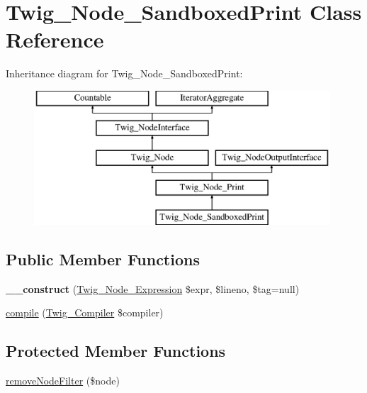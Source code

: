 \hypertarget{class_twig___node___sandboxed_print}{}\section{Twig\+\_\+\+Node\+\_\+\+Sandboxed\+Print Class Reference}
\label{class_twig___node___sandboxed_print}
Inheritance diagram for Twig\+\_\+\+Node\+\_\+\+Sandboxed\+Print\+:\begin{figure}[H]
\begin{center}
\leavevmode
\includegraphics[height=5.000000cm]{class_twig___node___sandboxed_print}
\end{center}
\end{figure}
\subsection*{Public Member Functions}
\begin{DoxyCompactItemize}
\item 
\hypertarget{class_twig___node___sandboxed_print_a3846bdad0632470525ae7d3080f6b188}{}{\bfseries \+\_\+\+\_\+construct} (\hyperlink{class_twig___node___expression}{Twig\+\_\+\+Node\+\_\+\+Expression} \$expr, \$lineno, \$tag=null)\label{class_twig___node___sandboxed_print_a3846bdad0632470525ae7d3080f6b188}

\item 
\hyperlink{class_twig___node___sandboxed_print_a4e0faa87c3fae583620b84d3607085da}{compile} (\hyperlink{class_twig___compiler}{Twig\+\_\+\+Compiler} \$compiler)
\end{DoxyCompactItemize}
\subsection*{Protected Member Functions}
\begin{DoxyCompactItemize}
\item 
\hyperlink{class_twig___node___sandboxed_print_ae761088e1a4d87e5ddfc47b0376c340d}{remove\+Node\+Filter} (\$node)
\end{DoxyCompactItemize}
